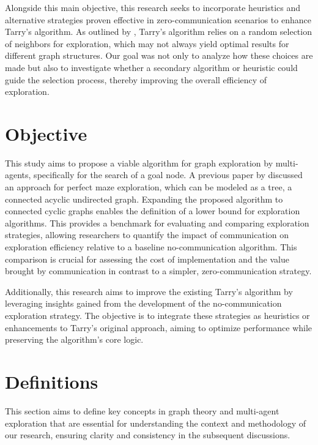 Alongside this main objective, this research seeks to incorporate heuristics and alternative strategies proven effective in zero-communication scenarios to enhance Tarry's algorithm. As outlined by , Tarry's algorithm relies on a random selection of neighbors for exploration, which may not always yield optimal results for different graph structures. Our goal was not only to analyze how these choices are made but also to investigate whether a secondary algorithm or heuristic could guide the selection process, thereby improving the overall efficiency of exploration.


\section{Objective}
\label{section_intro_objective}

This study aims to propose a viable algorithm for graph exploration by multi-agents, specifically for the search of a goal node.
A previous paper by  discussed an approach for perfect maze exploration, which can be modeled as a tree, a connected acyclic undirected graph.
Expanding the proposed algorithm to connected cyclic graphs enables the definition of a lower bound for exploration algorithms. This provides a benchmark for evaluating and comparing exploration strategies, allowing researchers to quantify the impact of communication on exploration efficiency relative to a baseline no-communication algorithm. This comparison is crucial for assessing the cost of implementation and the value brought by communication in contrast to a simpler, zero-communication strategy.

Additionally, this research aims to improve the existing Tarry's algorithm by leveraging insights gained from the development of the no-communication exploration strategy. The objective is to integrate these strategies as heuristics or enhancements to Tarry's original approach, aiming to optimize performance while preserving the algorithm's core logic.

\section{Definitions}
\label{section_intro_definitions}

This section aims to define key concepts in graph theory and
multi-agent exploration that are essential for understanding the context 
and methodology of our research, ensuring clarity and consistency in the subsequent discussions.

